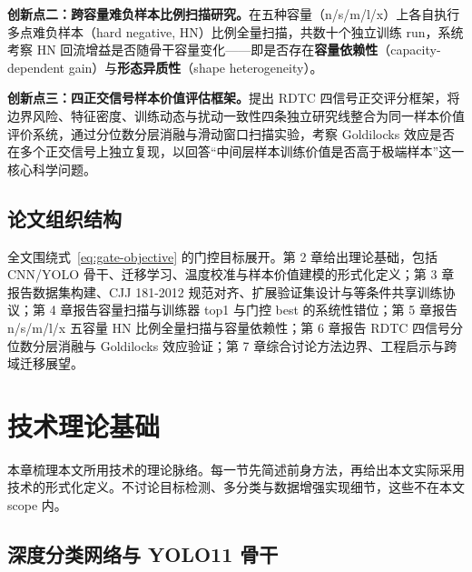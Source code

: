 \documentclass[UTF8,openany,12pt]{ctexbook}
\begin{document}
\noindent\textbf{创新点二：跨容量难负样本比例扫描研究。}在五种容量（n/s/m/l/x）上各自执行多点难负样本（hard negative, HN）比例全量扫描，共数十个独立训练 run，系统考察 HN 回流增益是否随骨干容量变化——即是否存在\textbf{容量依赖性}（capacity-dependent gain）与\textbf{形态异质性}（shape heterogeneity）。

\noindent\textbf{创新点三：四正交信号样本价值评估框架。}提出 RDTC 四信号正交评分框架，将边界风险\cite{lewis1994sequential,settles2009active}、特征密度\cite{sener2018active}、训练动态\cite{swayamdipta2020cartography,toneva2019empirical}与扰动一致性\cite{gal2017deep}四条独立研究线整合为同一样本价值评价系统，通过分位数分层消融与滑动窗口扫描实验，考察 Goldilocks 效应\cite{swayamdipta2020cartography}是否在多个正交信号上独立复现，以回答``中间层样本训练价值是否高于极端样本''这一核心科学问题。

\section{论文组织结构}
全文围绕式~\eqref{eq:gate-objective} 的门控目标展开。第 2 章给出理论基础，包括 CNN/YOLO 骨干、迁移学习、温度校准与样本价值建模的形式化定义；第 3 章报告数据集构建、CJJ 181-2012 规范对齐、扩展验证集设计与等条件共享训练协议；第 4 章报告容量扫描与训练器 top1 与门控 best 的系统性错位；第 5 章报告 n/s/m/l/x 五容量 HN 比例全量扫描与容量依赖性；第 6 章报告 RDTC 四信号分位数分层消融与 Goldilocks 效应验证；第 7 章综合讨论方法边界、工程启示与跨域迁移展望。

\chapter{技术理论基础}

本章梳理本文所用技术的理论脉络。每一节先简述前身方法，再给出本文实际采用技术的形式化定义。不讨论目标检测、多分类与数据增强实现细节，这些不在本文 scope 内。

\section{深度分类网络与 YOLO11 骨干}
\end{document}
